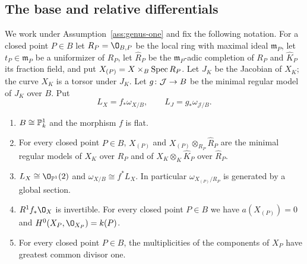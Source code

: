 \subsection{The base and relative differentials}

We work under Assumption~\ref{ass:genus-one} and fix the following notation.
For a closed point $P\in B$ let $R_P = \O_{B,P}$ be the local ring with maximal ideal $\mathfrak m_P$, let $t_P\in\mathfrak m_P$ be a uniformizer of $R_P$, let $\widehat R_P$ be the $\mathfrak m_P$-adic completion of $R_P$ and $\widehat K_P$ its fraction field, and put $X_{(P)} = X\times_B\operatorname{Spec} R_P$.
Let $J_K$ be the Jacobian of $X_K$; the curve $X_K$ is a torsor under $J_K$.
Let $g\colon\mathcal J\to B$ be the minimal regular model of $J_K$ over $B$.
Put
\[
  L_X = f_*\omega_{X/B},\qquad L_J = g_*\omega_{\mathcal J/B}.
\]

\begin{lemma}\label{lem:base}
\begin{enumerate}
\item $B\cong\mathbb{P}^1_k$ and the morphism $f$ is flat.
\item For every closed point $P\in B$, $X_{(P)}$ and $X_{(P)}\otimes_{R_P}\widehat R_P$ are the minimal regular models of $X_K$ over $R_P$ and of $X_K\otimes_K\widehat K_P$ over $\widehat R_P$.
\item $L_X\cong\O_{\PP^1}(2)$ and $\omega_{X/B}\cong f^*L_X$.
  In particular $\omega_{X_{(P)}/R_P}$ is generated by a global section.
\item $R^1f_*\O_X$ is invertible.
  For every closed point $P\in B$ we have $a(X_{(P)}) = 0$ and $H^0(X_P,\O_{X_P}) = k(P)$.
\item For every closed point $P\in B$, the multiplicities of the components of $X_P$ have greatest common divisor one.
\end{enumerate}
\end{lemma}

